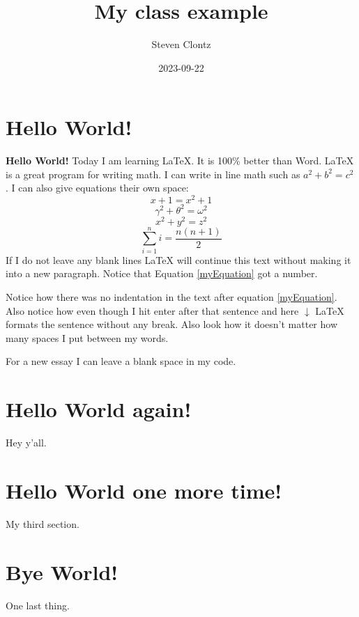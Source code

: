 \documentclass{article} %
\title{My class example} %
\author{Steven Clontz} %
\date{2023-09-22} %
\begin{document}
\maketitle %

\section{Hello World!} %

\textbf{Hello World!} Today I am learning \LaTeX.
It is 100\% better than Word. %
\LaTeX{} is a great program for writing math.
I can write in line math such as $a^2+b^2=c^2$ %
. I can also give equations their own space:
\begin{equation} \label{myWorseEquation} %
  x+1=x^2+1
\end{equation}
\begin{equation} \label{myEquation} %
  \gamma^2+\theta^2=\omega^2
\end{equation}
$$
  x^2+y^2=z^2
$$
\[
  \sum_{i=1}^n i = \frac{n(n+1)}{2}
\]
If I do not leave any blank lines \LaTeX{} will continue
this text without making it into a new paragraph. Notice
that Equation \ref{myEquation} got a number.




Notice how there was no indentation
in the text after equation \ref{myEquation}.
Also notice how even though I hit enter after that sentence
and here $\downarrow$
\LaTeX{} formats the sentence without any break.
Also   look  how      it   doesn't     matter
how    many  spaces     I put     between       my    words.

For a new essay I can leave a blank space in my code.

\section{Hello World again!} %

Hey y'all.


\section{Hello World one more time!} %

My third section.

\section{Bye World!} %

One last thing.
\end{document}
